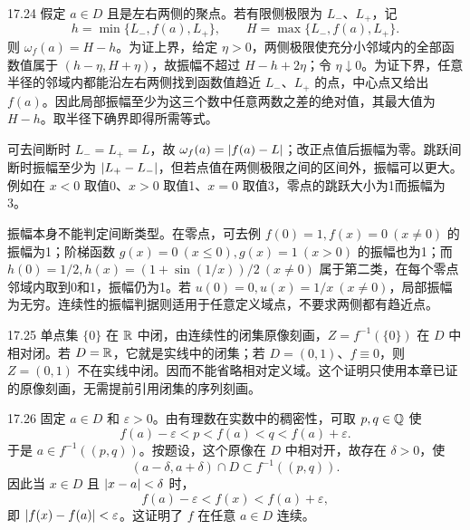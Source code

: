\begin{solution}{17.24}
假定 \(a\in D\) 且是左右两侧的聚点。若有限侧极限为 \(L_-\)、\(L_+\)，记
\[
 h=\min\{L_-,f(a),L_+\},\qquad H=\max\{L_-,f(a),L_+\}.
\]
则 \(\omega_f(a)=H-h\)。为证上界，给定 \(\eta>0\)，两侧极限使充分小邻域内的全部函数值属于 \((h-\eta,H+\eta)\)，故振幅不超过 \(H-h+2\eta\)；令 \(\eta\downarrow0\)。为证下界，任意半径的邻域内都能沿左右两侧找到函数值趋近 \(L_-\)、\(L_+\) 的点，中心点又给出 \(f(a)\)。因此局部振幅至少为这三个数中任意两数之差的绝对值，其最大值为 \(H-h\)。取半径下确界即得所需等式。

可去间断时 \(L_-=L_+=L\)，故 \(\omega_f(a)=\left|f(a)-L\right|\)；改正点值后振幅为零。跳跃间断时振幅至少为 \(\left|L_+-L_-\right|\)，但若点值在两侧极限之间的区间外，振幅可以更大。例如在 \(x<0\) 取值0、\(x>0\) 取值1、\(x=0\) 取值3，零点的跳跃大小为1而振幅为3。

振幅本身不能判定间断类型。在零点，可去例 \(f(0)=1,f(x)=0\ (x\ne0)\) 的振幅为1；阶梯函数 \(g(x)=0\ (x\le0),g(x)=1\ (x>0)\) 的振幅也为1；而 \(h(0)=1/2,h(x)=(1+\sin(1/x))/2\ (x\ne0)\) 属于第二类，在每个零点邻域内取到0和1，振幅仍为1。若 \(u(0)=0,u(x)=1/x\ (x\ne0)\)，局部振幅为无穷。连续性的振幅判据则适用于任意定义域点，不要求两侧都有趋近点。
\end{solution}

\begin{solution}{17.25}
单点集 \(\{0\}\) 在 \(\mathbb{R}\) 中闭，由连续性的闭集原像刻画，\(Z=f^{-1}(\{0\})\) 在 \(D\) 中相对闭。若 \(D=\mathbb{R}\)，它就是实线中的闭集；若 \(D=(0,1)\)、\(f\equiv0\)，则 \(Z=(0,1)\) 不在实线中闭。因而不能省略相对定义域。这个证明只使用本章已证的原像刻画，无需提前引用闭集的序列刻画。
\end{solution}

\begin{solution}{17.26}
固定 \(a\in D\) 和 \(\varepsilon>0\)。由有理数在实数中的稠密性，可取 \(p,q\in\mathbb{Q}\) 使
\[
 f(a)-\varepsilon<p<f(a)<q<f(a)+\varepsilon.
\]
于是 \(a\in f^{-1}((p,q))\)。按题设，这个原像在 \(D\) 中相对开，故存在 \(\delta>0\)，使
\[
 (a-\delta,a+\delta)\cap D
 \subset f^{-1}((p,q)).
\]
因此当 \(x\in D\) 且 \(\left|x-a\right|<\delta\) 时，
\[
 f(a)-\varepsilon<f(x)<f(a)+\varepsilon,
\]
即 \(\left|f(x)-f(a)\right|<\varepsilon\)。这证明了 \(f\) 在任意 \(a\in D\) 连续。
\end{solution}
